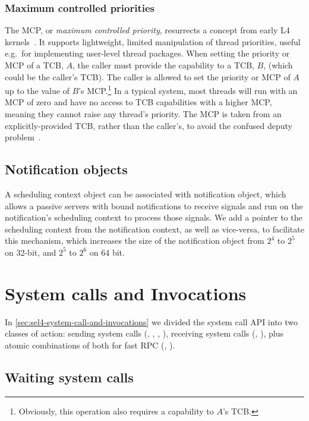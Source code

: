 \subsubsection{Maximum controlled priorities}

The MCP, or \emph{maximum controlled priority}, resurrects a concept from early L4
kernels~\citep{Liedtke_96:rm}. It supports lightweight, limited manipulation of thread priorities,
useful e.g.\ for implementing user-level thread packages. When setting
the priority or MCP of a TCB, \(A\),
the caller must provide the capability to a TCB, \(B\), (which could be the caller's
TCB). The caller is allowed to set the priority or MCP of \(A\) up to the value
of \(B\)'s MCP.\footnote{Obviously, this operation also requires a capability to \(A\)'s TCB.}
In a typical system, most threads
will run with an MCP of zero and have no access to TCB capabilities with a higher MCP, meaning they
cannot raise any thread's priority.
The MCP is taken from an explicitly-provided TCB, rather than the caller's, to avoid the
confused deputy problem~\citep{Hardy_88}.

\subsection{Notification objects}

A scheduling context object can be associated with notification object, which allows a passive
servers with bound notifications to receive signals and run on the notification's
scheduling context to process those signals.
We add a pointer to the scheduling context from the notification context, as well as vice-versa, to 
facilitate this mechanism, which increases the size of the notification object from $2^{4}$ to
$2^{5}$ on 32-bit, and $2^{5}$ to $2^{6}$ on 64 bit. 

\section{System calls and Invocations}

In \cref{sec:sel4-system-call-and-invocations} we divided the \selfour system call API into two
classes of action: sending system calls (, , , ),
receiving system calls (, ), plus atomic combinations of both for fast 
RPC (, ).  


\subsection{Waiting system calls}

